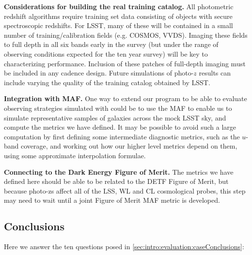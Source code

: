\textbf{Considerations for building the real training catalog.} All
photometric redshift algorithms require training set data consisting of
objects with secure spectroscopic redshifts.  For LSST, many of these
will be contained in a small number of training/calibration fields (e.g.
COSMOS, VVDS).  Imaging these fields to full depth in all six bands
early in the survey (but under the range of observing conditions
expected for the ten year survey) will be key to characterizing
performance.  Inclusion of these patches of full-depth imaging must be
included in any cadence design. Future simulations of photo-$z$ results
can include varying the quality of the training catalog obtained by
LSST.

\textbf{Integration with MAF.} One way to extend our program to be able
to evaluate observing strategies simulated with \OpSim could be to use
the MAF to enable us to simulate representative samples of galaxies
across the mock LSST sky, and compute the metrics we have defined.
It may be possible to avoid such a large computation by first defining
some intermediate diagnostic metrics, such as the $u$-band coverage, and
working out how our higher level metrics depend on them, using some
approximate interpolation formulae.

\textbf{Connecting to the Dark Energy Figure of Merit.} The metrics we
have defined here should be able to be related to the DETF Figure of
Merit, but because photo-zs affect all of the LSS, WL and CL
cosmological probes, this step may need to wait until a joint
Figure of Merit MAF metric is developed.

%
 \subsection{Conclusions}

 Here we answer the ten questions posed in
 \autoref{sec:intro:evaluation:caseConclusions}:

